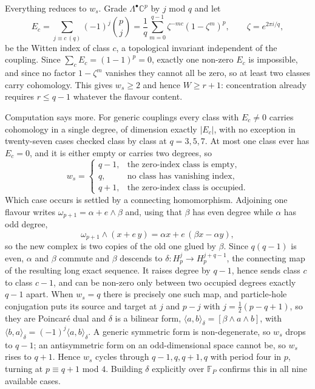 \documentclass[10pt]{article}
\begin{document}
Everything reduces to $w_s$. Grade $\Lambda^\bullet\mathbb C^p$ by $j$ mod $q$ and let
\begin{equation}
E_c=\sum_{j\equiv c\ (q)}(-1)^j\binom pj=\frac1q\sum_{m=0}^{q-1}\zeta^{-mc}(1-\zeta^m)^p,\qquad
\zeta=e^{2\pi i/q},
\label{eq:index}
\end{equation}
be the Witten index of class $c$, a topological invariant independent of the coupling. Since
$\sum_cE_c=(1-1)^p=0$, exactly one non-zero $E_c$ is impossible, and since no factor $1-\zeta^m$ vanishes they
cannot all be zero, so at least two classes carry cohomology. This gives $w_s\ge2$ and hence $W\ge r+1$:
concentration already requires $r\le q-1$ whatever the flavour content.

Computation says more. For generic couplings every class with $E_c\ne0$ carries cohomology in a single degree,
of dimension exactly $|E_c|$, with no exception in twenty-seven cases checked class by class at $q=3,5,7$. At
most one class ever has $E_c=0$, and it is either empty or carries two degrees, so
\begin{equation}
w_s=\begin{cases} q-1,&\text{the zero-index class is empty},\\
q,&\text{no class has vanishing index},\\
q+1,&\text{the zero-index class is occupied}.\end{cases}
\label{eq:trichotomy}
\end{equation}
Which case occurs is settled by a connecting homomorphism. Adjoining one flavour writes
$\omega_{p+1}=\alpha+e\wedge\beta$ and, using that $\beta$ has even degree while $\alpha$ has odd degree,
\begin{equation}
\omega_{p+1}\wedge(x+e\,y)=\alpha x+e\,(\beta x-\alpha y),
\end{equation}
so the new complex is two copies of the old one glued by $\beta$. Since $q(q-1)$ is even, $\alpha$ and $\beta$
commute and $\beta$ descends to $\delta:H^j_p\to H^{j+q-1}_p$, the connecting map of the resulting long exact
sequence. It raises degree by $q-1$, hence sends class $c$ to class $c-1$, and can be non-zero only between two
occupied degrees exactly $q-1$ apart. When $w_s=q$ there is precisely one such map, and particle-hole
conjugation puts its source and target at $j$ and $p-j$ with $j=\frac12(p-q+1)$, so they are Poincar\'e dual and
$\delta$ is a bilinear form,
$\langle a,b\rangle_\delta=[\beta\wedge a\wedge b]$, with
$\langle b,a\rangle_\delta=(-1)^j\langle a,b\rangle_\delta$. A generic symmetric form is non-degenerate, so
$w_s$ drops to $q-1$; an antisymmetric form on an odd-dimensional space cannot be, so $w_s$ rises to $q+1$.
Hence $w_s$ cycles through $q-1,q,q+1,q$ with period four in $p$, turning at $p\equiv q+1$ mod $4$. Building
$\delta$ explicitly over $\mathbb F_P$ confirms this in all nine available cases.
\end{document}
